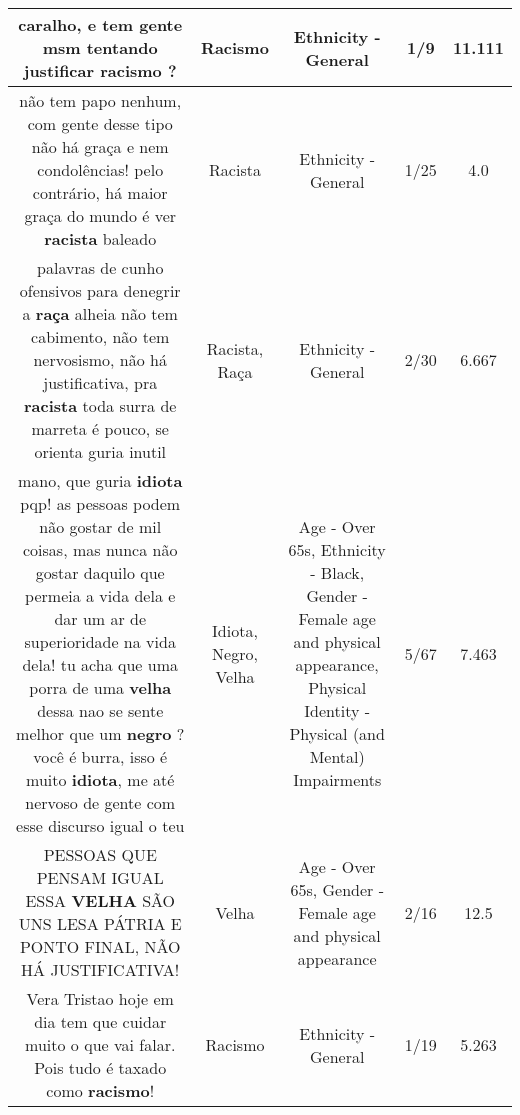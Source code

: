 \documentclass[11pt]{article}
\newlength\mylength
\begin{document}
\begin{center}
\begin{longtable}{|C{.65\mylength}|C{.30\mylength}|C{.12\mylength}|C{.12\mylength}|C{.12\mylength}|}
  \small caralho, e tem gente msm tentando justificar \textbf{racismo} ?\normalsize   & Racismo & Ethnicity - General & 1/9 & 11.111 \\  \hline
  \small não tem papo nenhum, com gente desse tipo não há graça e nem condolências! pelo contrário, há maior graça do mundo é ver \textbf{racista} baleado\normalsize   & Racista & Ethnicity - General & 1/25 & 4.0 \\  \hline
  \small palavras de cunho ofensivos para denegrir a \textbf{raça} alheia não tem cabimento, não tem nervosismo, não há justificativa, pra \textbf{racista} toda surra de marreta é pouco, se orienta guria inutil\normalsize   & Racista, Raça & Ethnicity - General & 2/30 & 6.667 \\  \hline
  \small mano, que guria \textbf{idiota} pqp! as pessoas podem não gostar de mil coisas, mas nunca não gostar daquilo que permeia a vida dela e dar um ar de superioridade na vida dela! tu acha que uma porra de uma \textbf{v\textbf{elha}} dessa nao se sente melhor que um \textbf{negro} ? você é burra, isso é muito \textbf{idiota}, me até nervoso de gente com esse discurso igual o teu\normalsize   & Idiota, Negro, Velha & Age - Over 65s, Ethnicity - Black, Gender - Female age and physical appearance, Physical Identity - Physical (and Mental) Impairments & 5/67 & 7.463 \\  \hline
  \small PESSOAS QUE PENSAM IGUAL ESSA \textbf{V\textbf{ELHA}} SÃO UNS LESA PÁTRIA E PONTO FINAL, NÃO HÁ JUSTIFICATIVA!\normalsize   & Velha & Age - Over 65s, Gender - Female age and physical appearance & 2/16 & 12.5 \\  \hline
  \small Vera Tristao hoje em dia tem que cuidar muito o que vai falar.  Pois tudo é taxado como \textbf{racismo}!\normalsize   & Racismo & Ethnicity - General & 1/19 & 5.263 \\  \hline

\end{longtable}
\end{center}
\end{document}
